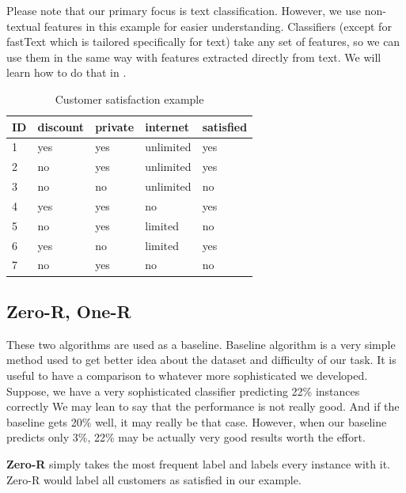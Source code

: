 Please note that our primary focus is text classification.
However, we use non-textual features in this example for easier understanding.
Classifiers (except for fastText which is tailored specifically for text) take any set of features,
so we can use them in the same way with features extracted directly from text.
We will learn how to do that in .

\begin{table}[h!]

\centering
\begin{tabular}{lllll}
\toprule
\textbf{ID} & \textbf{discount} & \textbf{private} & \textbf{internet} \hspace{1.cm} & \textbf{satisfied} \\
\midrule
1 & yes & yes & unlimited & yes \\
2 & no & yes & unlimited & yes \\
3 & no & no & unlimited & no \\
4 & yes & yes & no & yes \\
5 & no & yes & limited & no \\
6 & yes & no & limited & yes \\
7 & no & yes & no & no \\
\bottomrule
\end{tabular}

\caption{Customer satisfaction example}\label{tab:custsatis}
\end{table}






\subsection{Zero-R, One-R}

These two algorithms are used as a baseline.
Baseline algorithm is a very simple method used to get better idea about the dataset and difficulty of our task.
It is useful to have a comparison to whatever more sophisticated we developed.
Suppose, we have a very sophisticated classifier predicting 22\% instances correctly
We may lean to say that the performance is not really good.
And if the baseline gets 20\% well, it may really be that case.
However, when our baseline predicts only 3\%, 22\% may be actually very good results worth the effort.

{\bf Zero-R} simply takes the most frequent label and labels every instance with it.
Zero-R would label all customers as satisfied in our example.

